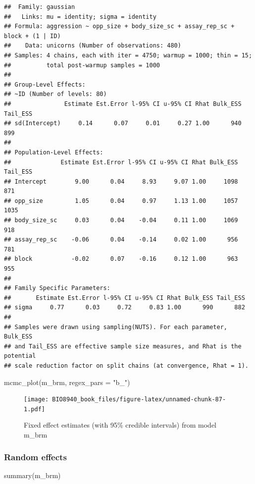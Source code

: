 \documentclass[
  12pt,
]{book}
\newenvironment{Shaded}{\begin{snugshade}}{\end{snugshade}}
\newcommand{\AttributeTok}[1]{\textcolor[rgb]{0.77,0.63,0.00}{#1}}
\newcommand{\FunctionTok}[1]{\textcolor[rgb]{0.00,0.00,0.00}{#1}}
\newcommand{\NormalTok}[1]{#1}
\newcommand{\StringTok}[1]{\textcolor[rgb]{0.31,0.60,0.02}{#1}}
\begin{document}
\begin{verbatim}
##  Family: gaussian 
##   Links: mu = identity; sigma = identity 
## Formula: aggression ~ opp_size + body_size_sc + assay_rep_sc + block + (1 | ID) 
##    Data: unicorns (Number of observations: 480) 
## Samples: 4 chains, each with iter = 4750; warmup = 1000; thin = 15;
##          total post-warmup samples = 1000
## 
## Group-Level Effects: 
## ~ID (Number of levels: 80) 
##               Estimate Est.Error l-95% CI u-95% CI Rhat Bulk_ESS Tail_ESS
## sd(Intercept)     0.14      0.07     0.01     0.27 1.00      940      899
## 
## Population-Level Effects: 
##              Estimate Est.Error l-95% CI u-95% CI Rhat Bulk_ESS Tail_ESS
## Intercept        9.00      0.04     8.93     9.07 1.00     1098      871
## opp_size         1.05      0.04     0.97     1.13 1.00     1057     1035
## body_size_sc     0.03      0.04    -0.04     0.11 1.00     1069      918
## assay_rep_sc    -0.06      0.04    -0.14     0.02 1.00      956      781
## block           -0.02      0.07    -0.16     0.12 1.00      963      955
## 
## Family Specific Parameters: 
##       Estimate Est.Error l-95% CI u-95% CI Rhat Bulk_ESS Tail_ESS
## sigma     0.77      0.03     0.72     0.83 1.00      990      882
## 
## Samples were drawn using sampling(NUTS). For each parameter, Bulk_ESS
## and Tail_ESS are effective sample size measures, and Rhat is the potential
## scale reduction factor on split chains (at convergence, Rhat = 1).
\end{verbatim}

\begin{Shaded}
\begin{Highlighting}[]
\FunctionTok{mcmc\_plot}\NormalTok{(m\_brm, }\AttributeTok{regex\_pars =} \StringTok{"b\_"}\NormalTok{)}
\end{Highlighting}
\end{Shaded}

\begin{figure}
\centering
\texttt{[image: BIO8940\_book\_files/figure-latex/unnamed-chunk-87-1.pdf]}
\caption{\label{fig:unnamed-chunk-87}Fixed effect estimates (with 95\% credible intervals) from model m\_brm}
\end{figure}

\hypertarget{random-effects-3}{%
\subsubsection{Random effects}\label{random-effects-3}}

\begin{Shaded}
\begin{Highlighting}[]
\FunctionTok{summary}\NormalTok{(m\_brm)}
\end{Highlighting}
\end{Shaded}
\end{document}

